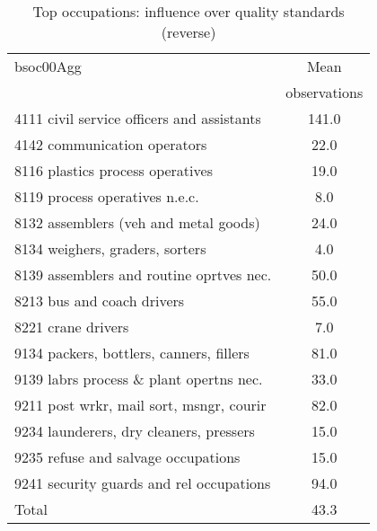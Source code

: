 \begin{table}
	\centering
	\caption{Top occupations: influence over quality standards (reverse)}
	\begin{tabular}{lc}
	\toprule	
		
bsoc00Agg&Mean \\
&observations \\
\hline
4111 civil service officers and assistants&141.0 \\
4142 communication operators&22.0 \\
8116 plastics process operatives&19.0 \\
8119 process operatives n.e.c.&8.0 \\
8132 assemblers (veh and metal goods)&24.0 \\
8134 weighers, graders, sorters&4.0 \\
8139 assemblers and routine oprtves nec.&50.0 \\
8213 bus and coach drivers&55.0 \\
8221 crane drivers&7.0 \\
9134 packers, bottlers, canners, fillers&81.0 \\
9139 labrs process \& plant opertns nec.&33.0 \\
9211 post wrkr, mail sort, msngr, courir&82.0 \\
9234 launderers, dry cleaners, pressers&15.0 \\
9235 refuse and salvage occupations&15.0 \\
9241 security guards and rel occupations&94.0 \\
Total&43.3 \\
\bottomrule
\bottomrule
\end{tabular}
\end{table}

